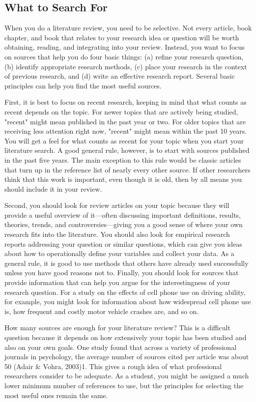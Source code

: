 \subsection{What to Search For}
When you do a literature review, you need to be selective. Not every article, book chapter, and book that relates to your research idea or question will be worth obtaining, reading, and integrating into your review. Instead, you want to focus on sources that help you do four basic things: (a) refine your research question, (b) identify appropriate research methods, (c) place your research in the context of previous research, and (d) write an effective research report. Several basic principles can help you find the most useful sources.

First, it is best to focus on recent research, keeping in mind that what counts as recent depends on the topic. For newer topics that are actively being studied, "recent" might mean published in the past year or two. For older topics that are receiving less attention right now, "recent" might mean within the past 10 years. You will get a feel for what counts as recent for your topic when you start your literature search. A good general rule, however, is to start with sources published in the past five years. The main exception to this rule would be classic articles that turn up in the reference list of nearly every other source. If other researchers think that this work is important, even though it is old, then by all means you should include it in your review.

Second, you should look for review articles on your topic because they will provide a useful overview of it---often discussing important definitions, results, theories, trends, and controversies---giving you a good sense of where your own research fits into the literature. You should also look for empirical research reports addressing your question or similar questions, which can give you ideas about how to operationally define your variables and collect your data. As a general rule, it is good to use methods that others have already used successfully unless you have good reasons not to. Finally, you should look for sources that provide information that can help you argue for the interestingness of your research question. For a study on the effects of cell phone use on driving ability, for example, you might look for information about how widespread cell phone use is, how frequent and costly motor vehicle crashes are, and so on.

How many sources are enough for your literature review? This is a difficult question because it depends on how extensively your topic has been studied and also on your own goals. One study found that across a variety of professional journals in psychology, the average number of sources cited per article was about 50 (Adair \& Vohra, 2003)1. This gives a rough idea of what professional researchers consider to be adequate. As a student, you might be assigned a much lower minimum number of references to use, but the principles for selecting the most useful ones remain the same.

